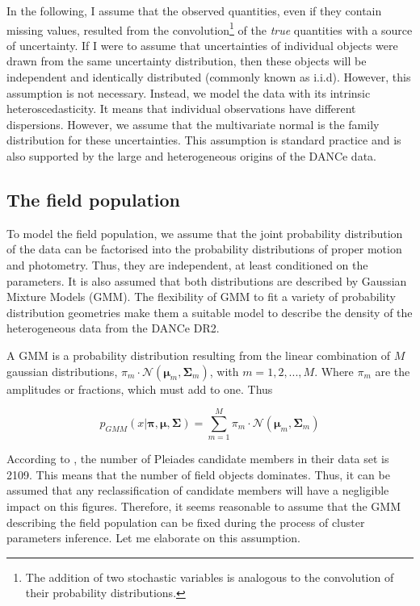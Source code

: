 In the following, I assume that the observed quantities, even if they contain missing values, resulted from the convolution\footnote{The addition of two stochastic variables is analogous to the convolution of their probability distributions.} of the \emph{true} quantities with a source of uncertainty. If I were to assume that uncertainties of individual objects were drawn from the same uncertainty distribution, then these objects will be independent and identically distributed (commonly known as i.i.d). However, this assumption is not necessary. Instead, we model the data with its intrinsic heteroscedasticity. It means that individual observations have different dispersions. However, we assume that the multivariate normal is the family distribution for these uncertainties. This assumption is standard practice and is also supported by the large and heterogeneous origins of the DANCe data. 

\subsection{The field population}
To model the field population, we assume that the joint probability distribution of the data can be factorised into the probability distributions of proper motion and photometry. Thus, they are independent, at least conditioned on the parameters. It is also assumed that both distributions are described by Gaussian Mixture Models (GMM). The flexibility of GMM to fit a variety of probability distribution geometries make them a suitable model to describe the density of the heterogeneous data from the DANCe DR2. 

A GMM is a probability distribution resulting from the linear combination of $M$ gaussian distributions, $\pi_m\cdot \mathcal{N}(\boldsymbol{\mu}_m,\boldsymbol{\Sigma}_m)$, with $m=1,2,...,M$. Where $\pi_m$ are the amplitudes or fractions, which must add to one. Thus

\begin{equation}
p_{GMM}(x|\boldsymbol{\pi},\boldsymbol{\mu},\boldsymbol{\Sigma})=\sum_{m=1}^M \pi_m \cdot \mathcal{N}(\boldsymbol{\mu}_m,\boldsymbol{\Sigma}_m)
\end{equation}

According to \citet{Bouy2015}, the number of Pleiades candidate members in their data set is 2109. This means that the number of field objects dominates. Thus, it can be assumed that any reclassification of candidate members will have a negligible impact on this figures. Therefore, it seems reasonable to assume that the GMM describing the field population can be fixed during the process of cluster parameters inference. Let me elaborate on this assumption.

